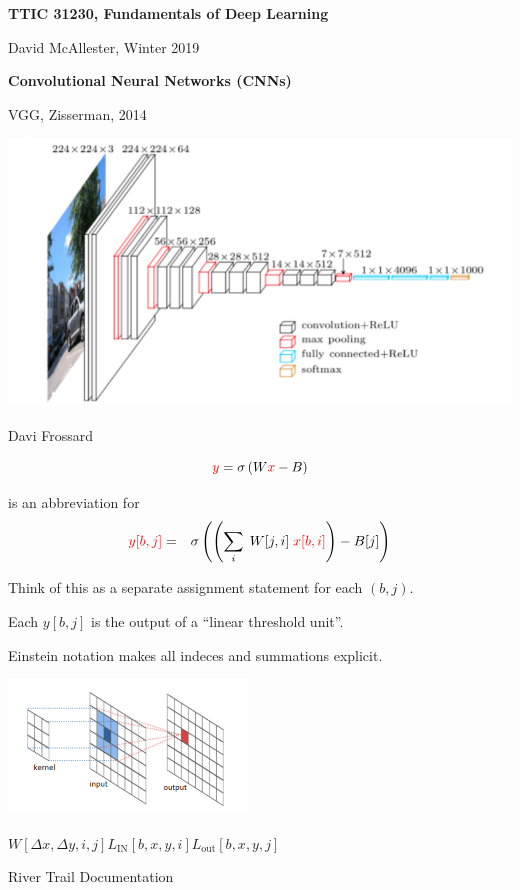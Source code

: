 




{\Huge

  \centerline{\bf TTIC 31230, Fundamentals of Deep Learning}
  \bigskip
  \centerline{David McAllester, Winter 2019}

    \vfill
  \centerline{\bf Convolutional Neural Networks (CNNs)}
  \vfill
  \vfill


{VGG, Zisserman, 2014}

\centerline{\includegraphics[width = 8.0in]{../images/VGG}}
\centerline{\large Davi Frossard}


$${\color{red} y} = \sigma\left(W{\color{red} x} - B\right)$$

\vfill
is an abbreviation for
\begin{eqnarray*}
  {\color{red} y[b,j]} & = & \sigma\left(\left(\sum_i\;W[j,i] \;{\color{red} x[b,i]}\right) - B[j]\right) 
\end{eqnarray*}

\vfill
Think of this as a separate assignment statement for each {\color{red} $(b,j)$}.

\vfill
Each {\color{red} $y[b,j]$} is the output of a ``linear threshold unit''.

\vfill
Einstein notation makes all indeces and summations explicit.


\centerline{\includegraphics[width = 2.5in]{../images/Convolution}}
\centerline{$W[\Delta x,\Delta y,i,j]$\hspace{6ex}$L_{\mathrm{IN}}[b,x,y,i]$\hspace{6ex}$L_{\mathrm{out}}[b,x,y,j]$}
\centerline{\large River Trail Documentation}

}
